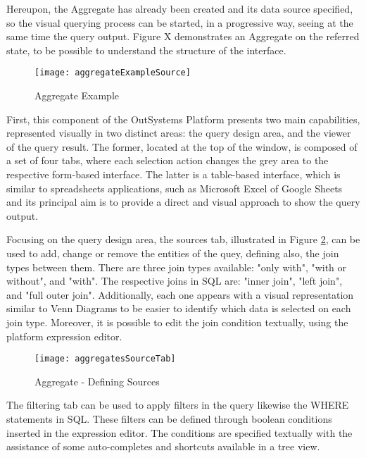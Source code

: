 
Hereupon, the Aggregate has already been created and its data source specified, so the visual querying process can be started, in a progressive way, seeing at the same time the query output. Figure X demonstrates an Aggregate on the referred state, to be possible to understand the structure of the interface.

\begin{figure}[htbp]
	\centering
	\texttt{[image: aggregateExampleSource]}
	\caption{Aggregate Example}
	\label{fig:aggregate_created}
\end{figure}

First, this component of the OutSystems Platform presents two main capabilities, represented visually in two distinct areas: the query design area, and the viewer of the query result. The former, located at the top of the window, is composed of a set of four tabs, where each selection action changes the grey area to the respective form-based interface. The latter is a table-based interface, which is similar to spreadsheets applications, such as Microsoft Excel \cite{microsoftExcel} of Google Sheets \cite{googleSheets} and its principal aim is to provide a direct and visual approach to show the query output.

Focusing on the query design area, the sources tab, illustrated in Figure \ref{fig:aggregates_source_tab}, can be used to add, change or remove the entities of the quey, defining also, the join types between them. There are three join types available: "only with", "with or without", and "with". The respective joins in \gls{SQL} are: "inner join", "left join", and "full outer join". Additionally, each one appears with a visual representation similar to Venn Diagrams \cite{venn1880diagrams} to be easier to identify which data is selected on each join type. Moreover, it is possible to edit the join condition textually, using the platform expression editor.

\begin{figure}[htbp]
	\centering
	\texttt{[image: aggregatesSourceTab]}
	\caption{Aggregate - Defining Sources}
	\label{fig:aggregates_source_tab}
\end{figure}

The filtering tab can be used to apply filters in the query likewise the WHERE statements in \gls{SQL}. These filters can be defined through boolean conditions inserted in the expression editor. The conditions are specified textually with the assistance of some auto-completes and shortcuts available in a tree view. 

